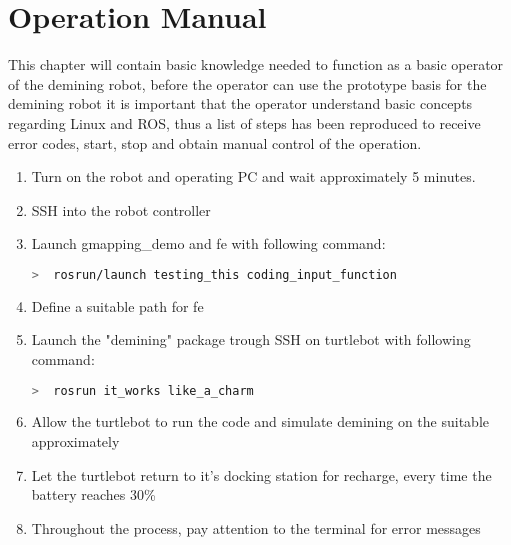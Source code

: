 \chapter{Operation Manual}


This chapter will contain basic knowledge needed to function as a basic operator of the demining robot, before the operator can use the prototype basis for the demining robot it is important that the operator understand basic concepts regarding Linux and ROS, thus a list of steps has been reproduced to receive error codes, start, stop and obtain manual control of the operation.

\begin{enumerate}
    \item Turn on the robot and operating PC and wait approximately 5 minutes.
    \item SSH into the robot controller
    \item Launch gmapping\_demo and fe with following command:\\
        \begin{lstlisting}[language=bash,numbers=none]
  >  rosrun/launch testing_this coding_input_function
        \end{lstlisting}
    \item Define a suitable path for fe
    \item Launch the "demining" package trough SSH on turtlebot with following command:\\
        \begin{lstlisting}[language=bash,numbers=none]
  >  rosrun it_works like_a_charm
        \end{lstlisting}
    \item Allow the turtlebot to run the code and simulate demining on the suitable approximately
    \item Let the turtlebot return to it's docking station for recharge, every time the battery reaches 30\%
    \item Throughout the process, pay attention to the terminal for error messages
\end{enumerate}